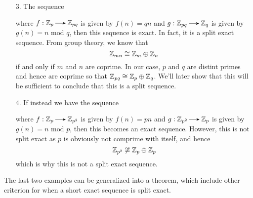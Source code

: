 \begin{itemize}
    \item[3.] The sequence
    \begin{center} 
    \end{center}
    where $f:\ZZ_p \to \ZZ_{pq}$ is given by $f(n) = qn$ and
    $g: \ZZ_{pq} \to \ZZ_q$ is given by $g(n) = n \mbox{ mod } q$,
    then this sequence is exact. In fact, it is a split exact sequence.
    From group theory, we know that 
    \[
        \mathbb{Z}_{mn} \cong \mathbb{Z}_m \oplus \mathbb{Z}_n
    \]
    if and only if $m$ and $n$ are coprime. In our case, $p$ and
    $q$ are distint primes and hence are coprime so that $\mathbb{Z}_{pq} \cong \mathbb{Z}_p \oplus \mathbb{Z}_q$. We'll later show
    that this will be sufficient to conclude that this is a split
    sequence.

    \item[4.] If instead we have the sequence
    \begin{center} 
    \end{center}
    where $f:\ZZ_p \to \ZZ_{p^2}$ is given by $f(n) = pn$ and
    $g: \ZZ_{p^2} \to \ZZ_p$ is given by $g(n) = n \mbox{ mod }p$,
    then this becomes
    an exact sequence. However, this is not split exact as
    $p$ is obviously not comprime with itself, and hence 
    \[
        \mathbb{Z}_{p^2} \not\cong \mathbb{Z}_p \oplus \mathbb{Z}_p
    \]
    which is why this is not a split exact sequence. 
\end{itemize}

The last two examples can be generalized into a theorem, which
include other criterion for when a short exact sequence is split
exact. 

